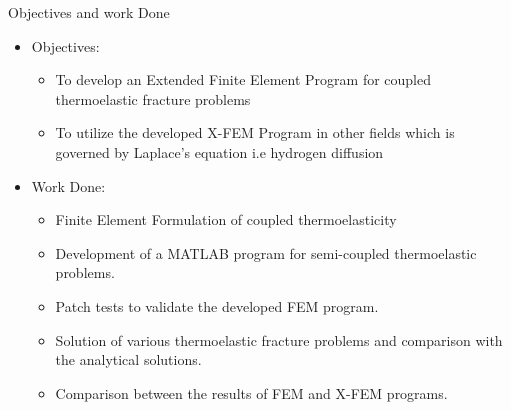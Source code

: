 \documentclass{beamer}
\begin{document}
\begin{frame}[t,fragile]{Objectives and work Done}
    \begin{itemize}
         \item Objectives:
            \begin{itemize}
                    \footnotesize
                 \item To develop an Extended Finite Element Program for coupled thermoelastic fracture problems 
                 \item To utilize the developed X-FEM Program in other fields which is governed by Laplace's equation i.e hydrogen diffusion 
                \end{itemize}
             \item Work Done:
    \begin{itemize}
                    \footnotesize
        \item Finite Element Formulation of coupled thermoelasticity 
        \item Development of a MATLAB program for semi-coupled thermoelastic problems.
        \item Patch tests to validate the developed FEM program.
        \item Solution of various thermoelastic fracture problems and comparison with the analytical solutions. 
        \item Comparison between the results of FEM and X-FEM programs. 
    \end{itemize}
    \end{itemize}
\end{frame}
\end{document}
